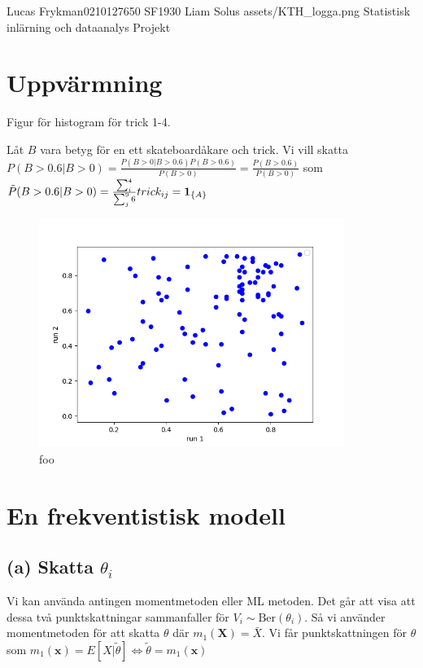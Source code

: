\documentclass{assignment}
\begin{document}
\assignmentTitle
{Lucas Frykman}{0210127650}
{SF1930}
{Liam Solus}
{assets/KTH_logga.png}
{Statistisk inlärning och dataanalys}
{Projekt}


\section{Uppvärmning}
Figur för histogram för trick 1-4.

Låt $B$ vara betyg för en ett skateboardåkare och trick. Vi vill skatta $P(B>0.6|B>0) = \frac{P(B>0|B>0.6)P(B>0.6)}{P(B>0)}=\frac{P(B>0.6)}{P(B>0)}$
som $\tilde{P}(B>0.6|B>0) = \frac{\sum_{i}^4}{\sum_{j}^96}trick_{ij} = \mathbf{1}_{\{A\}}$


\begin{figure}[!h]
    \caption{foo}
    \begin{center}
        \includegraphics[width = 99mm]{assets/Figure_1.png}
    \end{center}
\end{figure}


\section{En frekventistisk modell}
\subsection*{(a) Skatta $\theta_{i}$}
Vi kan använda antingen momentmetoden eller ML metoden. Det går att visa att dessa två punktskattningar sammanfaller för $V_i \sim \text{Ber}(\theta_i)$.
Så vi använder momentmetoden för att skatta $\theta$ där
$m_1(\mathbf{X}) = \bar{X}$. Vi får punktskattningen för $\theta$ som
$m_1(\mathbf{x})= E[X|\tilde{\theta}] \Leftrightarrow \tilde{\theta} = m_1(\mathbf{x})$
\end{document}
